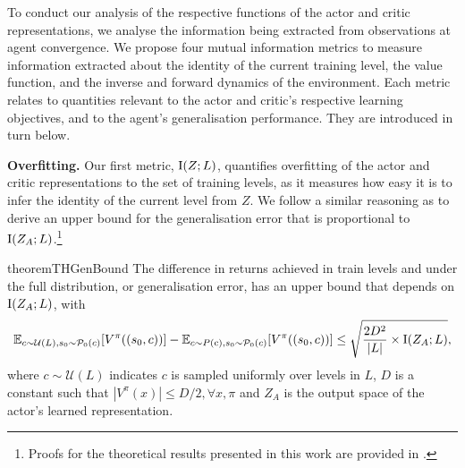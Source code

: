 %
To conduct our analysis of the respective functions of the actor and critic representations, we analyse the information being extracted from observations at agent convergence. We propose four mutual information metrics to measure information extracted about the identity of the current training level, the value function, and the inverse and forward dynamics of the environment. Each metric relates to quantities relevant to the actor and critic's respective learning objectives, and to the agent's generalisation performance. They are introduced in turn below.

\textbf{Overfitting.} Our first metric, $\text{I}(Z;L)$, quantifies overfitting of the actor and critic representations to the set of training levels, as it measures how easy it is to infer the identity of the current level from $Z$. We follow a similar reasoning as \citet{garcin2024dred} to derive an upper bound for the generalisation error that is proportional to $\text{I}(Z_A;L)$.\footnote{Proofs for the theoretical results presented in this work are provided in .}
\begin{restatable}{theorem}{THGenBound}\label{c2:th:genbound}
The difference in returns achieved in train levels and under the full distribution, or generalisation error, has an upper bound that depends on $\text{I}(Z_A;L)$, with
\begin{equation}
    \mathbb{E}_{c\sim \mathcal{U}(L), s_0 \sim \mathcal{P}_0(c)}[V^\pi((s_0,c))] - \mathbb{E}_{c\sim P({\textnormal{c}}), s_0 \sim \mathcal{P}_0(c)}[V^\pi((s_0,c))] \leq \sqrt{\frac{2D^2}{|L|} \times \text{I}(Z_A;L)},
\end{equation}
where $c\sim \mathcal{U}(L)$ indicates $c$ is sampled uniformly over levels in $L$, $D$ is a constant such that $|V^\pi (x)| \leq D/2,\forall x,\pi$ and $Z_A$ is the output space of the actor's learned representation.
\end{restatable}

